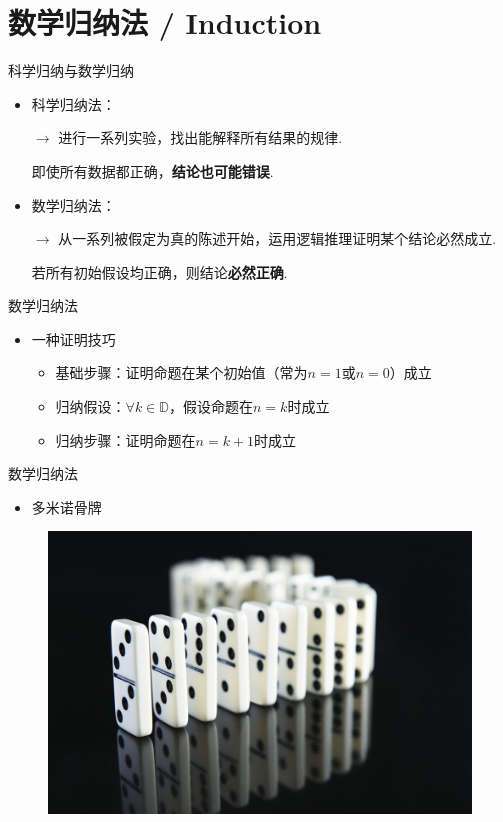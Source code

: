 \documentclass[]{beamer}
\begin{document}
\section{数学归纳法 / Induction}

\begin{frame}{科学归纳与数学归纳}
    \begin{itemize}
        \item 科学归纳法：
        
        $\rightarrow$ 进行一系列实验，找出能解释所有结果的规律.
        
        \hspace{1em} 即使所有数据都正确，\textbf{结论也可能错误}.

        \item 数学归纳法：
        
        $\rightarrow$ 从一系列被假定为真的陈述开始，运用逻辑推理证明某个结论必然成立.

        \hspace{1em} 若所有初始假设均正确，则结论\textbf{必然正确}.

    \end{itemize}
\end{frame}

\begin{frame}{数学归纳法}
    \begin{itemize}
        \item 一种证明技巧
        \begin{itemize}
            \item 基础步骤：证明命题在某个初始值（常为$n=1$或$n=0$）成立
            \item 归纳假设：$\forall k \in \mathbb{D}$，假设命题在$n=k$时成立
            \item 归纳步骤：证明命题在$n=k+1$时成立
        \end{itemize}
    \end{itemize}
\end{frame}

\begin{frame}{数学归纳法}
    \begin{itemize}
        \item 多米诺骨牌
    \end{itemize}
    \begin{figure}[H]
        \centering
        \includegraphics[width=0.7\linewidth]{induction1.jpg}
    \end{figure}
\end{frame}
\end{document}
